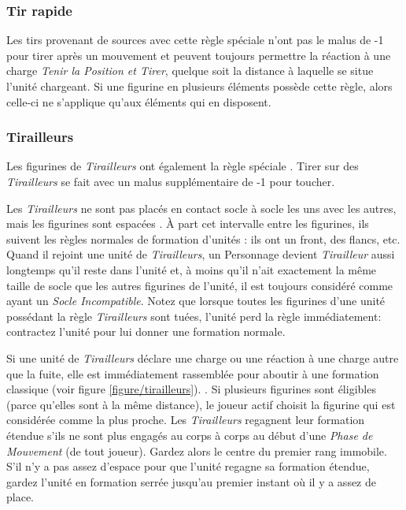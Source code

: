 \subsubsection*{Tir rapide}

Les tirs provenant de sources avec cette règle spéciale n'ont pas le malus de -1 pour tirer après un mouvement et peuvent toujours permettre la réaction à une charge \emph{Tenir la Position et Tirer}, quelque soit la distance à laquelle se situe l'unité chargeant. Si une figurine en plusieurs éléments possède cette règle, alors celle-ci ne s'applique qu'aux éléments qui en disposent.

\subsubsection*{Tirailleurs}

Les figurines de \emph{Tirailleurs} ont également la règle spéciale . Tirer sur des \emph{Tirailleurs} se fait avec un malus supplémentaire de -1 pour toucher.

Les \emph{Tirailleurs} ne sont pas placés en contact socle à socle les uns avec les autres, mais les figurines sont espacées . À part cet intervalle entre les figurines, ils suivent les règles normales de formation d'unités : ils ont un front, des flancs, etc.  Quand il rejoint une unité de \emph{Tirailleurs}, un Personnage devient \emph{Tirailleur} aussi longtemps qu'il reste dans l'unité et, à moins qu'il n'ait exactement la même taille de socle que les autres figurines de l'unité, il est toujours considéré comme ayant un \emph{Socle Incompatible}. Notez que lorsque toutes les figurines d'une unité possédant la règle \emph{Tirailleurs} sont tuées, l'unité perd la règle immédiatement: contractez l'unité pour lui donner une formation normale.

Si une unité de \emph{Tirailleurs} déclare une charge ou une réaction à une charge autre que la fuite, elle est immédiatement rassemblée pour aboutir à une formation classique (voir figure \ref{figure/tirailleurs}). . Si plusieurs figurines sont éligibles (parce qu'elles sont à la même distance), le joueur actif choisit la figurine qui est considérée comme la plus proche. Les \emph{Tirailleurs} regagnent leur formation étendue s'ils ne sont plus engagés au corps à corps au début d'une \emph{Phase de Mouvement} (de tout joueur). Gardez alors le centre du premier rang immobile. S'il n'y a pas assez d'espace pour que l'unité regagne sa formation étendue, gardez l'unité en formation serrée jusqu'au premier instant où il y a assez de place.

